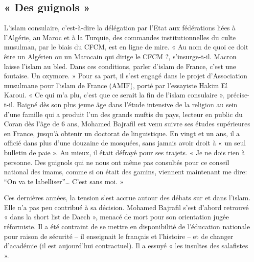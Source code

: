 \subsection*{« Des guignols »}
L’islam consulaire, c’est-à-dire la délégation par l’Etat aux fédérations liées à l’Algérie, au Maroc et à la Turquie, des commandes institutionnelles du culte musulman, par le biais du CFCM, est en ligne de mire. « Au nom de quoi ce doit être un Algérien ou un Marocain qui dirige le CFCM ?, s’insurge-t-il. Macron laisse l’islam au bled. Dans ces conditions, parler d’islam de France, c’est une foutaise. Un oxymore. » Pour sa part, il s’est engagé dans le projet d’Association musulmane pour l’islam de France (AMIF), porté par l’essayiste Hakim El Karoui. « Ce qui m’a plu, c’est que ce serait la fin de l’islam consulaire », précise-t-il.
Baigné dès son plus jeune âge dans l’étude intensive de la religion au sein d’une famille qui a produit l’un des grands muftis du pays, lecteur en public du Coran dès l’âge de 6 ans, Mohamed Bajrafil est venu suivre ses études supérieures en France, jusqu’à obtenir un doctorat de linguistique. En vingt et un ans, il a officié dans plus d’une douzaine de mosquées, sans jamais avoir droit à « un seul bulletin de paie ». Au mieux, il était défrayé pour ses trajets. « Je ne dois rien à personne. Des guignols qui ne nous ont même pas consultés pour ce conseil national des imams, comme si on était des gamins, viennent maintenant me dire: “On va te labelliser”… C’est sans moi. »
 
Ces dernières années, la tension s’est accrue autour des débats sur et dans l’islam. Elle n’a pas peu contribué à sa décision. Mohamed Bajrafil s’est d’abord retrouvé « dans la short list de Daech », menacé de mort pour son orientation jugée réformiste. Il a été contraint de se mettre en disponibilité de l’éducation nationale pour raison de sécurité – il enseignait le français et l’histoire – et de changer d’académie (il est aujourd’hui contractuel). Il a essuyé « les insultes des salafistes ».
